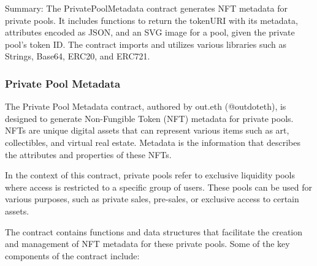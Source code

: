 Summary: The PrivatePoolMetadata contract generates NFT metadata for
private pools. It includes functions to return the tokenURI with its
metadata, attributes encoded as JSON, and an SVG image for a pool, given
the private pool's token ID. The contract imports and utilizes various
libraries such as Strings, Base64, ERC20, and ERC721.

\hypertarget{private-pool-metadata-1}{%
\subsubsection{Private Pool Metadata}\label{private-pool-metadata-1}}

The Private Pool Metadata contract, authored by out.eth (@outdoteth), is
designed to generate Non-Fungible Token (NFT) metadata for private
pools. NFTs are unique digital assets that can represent various items
such as art, collectibles, and virtual real estate. Metadata is the
information that describes the attributes and properties of these NFTs.

In the context of this contract, private pools refer to exclusive
liquidity pools where access is restricted to a specific group of users.
These pools can be used for various purposes, such as private sales,
pre-sales, or exclusive access to certain assets.

The contract contains functions and data structures that facilitate the
creation and management of NFT metadata for these private pools. Some of
the key components of the contract include:

